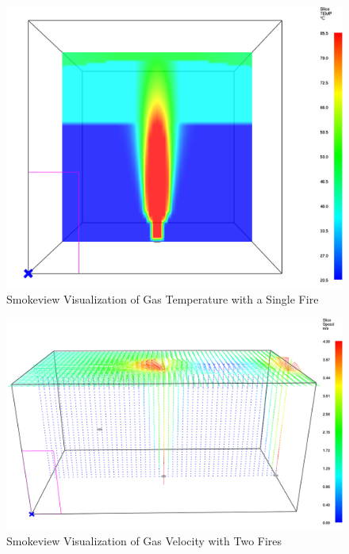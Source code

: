 \begin{figure}[h!]
\begin{center}
\includegraphics[width=6.5in]{FIGURES/SMV_Temperature}
\caption{Smokeview Visualization of Gas Temperature with a Single Fire}
\end{center}
\end{figure}

\begin{figure}[h!]
\begin{center}
\includegraphics[width=6.5in]{FIGURES/SMV_Velocity}
\caption{Smokeview Visualization of Gas Velocity with Two Fires}
\end{center}
\end{figure}

